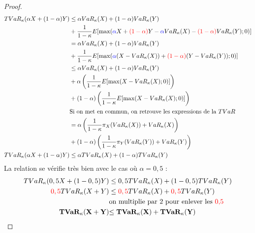 \begin{proof}
\begin{align*}
TVaR_\kappa(\alpha X + (1-\alpha ) Y) & \le \alpha VaR_\kappa(X) + (1-\alpha) VaR_\kappa(Y) \\
	& + \frac{1}{1 - \kappa} E [ \max( \textcolor{blue}{\alpha} X + \textcolor{red}{(1-\alpha)} Y - \textcolor{blue}{\alpha} VaR_\kappa(X) - \textcolor{red}{(1-\alpha)} VaR_\kappa(Y) ; 0)] \\ 
	& = \alpha VaR_\kappa(X) + (1-\alpha) VaR_\kappa(Y) \\
	& + \frac{1}{1 - \kappa} E[ \max( \textcolor{blue}{\alpha} (X - VaR_\kappa(X)) + \textcolor{red}{(1-\alpha )} (Y - VaR_\kappa(Y)) ; 0)] \\
	& \le \alpha VaR_\kappa(X) + (1-\alpha) VaR_\kappa(Y) \\
	& + \alpha \left( \frac{1}{1 - \kappa} E[\max( X - VaR_\kappa(X);0)] \right) \\
	& + (1 - \alpha) \left( \frac{1}{1 - \kappa} E[\max( X - VaR_\kappa(X);0)] \right) \\
	& \text{Si on met en commun, on retrouve les expressions de la $TVaR$} \\
	& = \alpha \left( \frac{1}{1 - \kappa} \pi_X(VaR_\kappa(X)) + VaR_\kappa(X) \right) \\
	& + (1 - \alpha) \left( \frac{1}{1 - \kappa} \pi_Y(VaR_\kappa(Y)) + VaR_\kappa(Y) \right) \\
TVaR_\kappa(\alpha X + (1- \alpha ) Y) & \le \alpha TVaR_\kappa(X) + (1- \alpha) TVaR_\kappa(Y) \\
\end{align*}
La relation se vérifie très bien avec le cas où $\alpha = 0,5$ : 
\begin{align*}
TVaR_\kappa(0,5X + (1-0,5)Y) & \le 0,5 TVaR_\kappa(X) + (1-0,5) TVaR_\kappa(Y) \\
\textcolor{red}{0,5} TVaR_\kappa(X + Y) & \le \textcolor{red}{0,5} TVaR_\kappa(X) + \textcolor{red}{0,5} TVaR_\kappa(Y) \\
	& \text{on multiplie par 2 pour enlever les \textcolor{red}{0,5}} \\
\mathbf{TVaR_\kappa(X + Y)} & \mathbf{\le TVaR_\kappa(X) + TVaR_\kappa(Y)} \\
\end{align*}

\end{proof}




